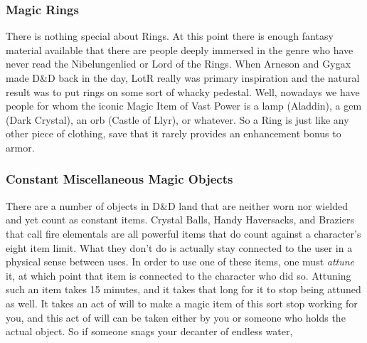 \subsubsection{Magic Rings}
\vspace*{-8pt}

There is nothing special about Rings. At this point there is enough fantasy material available that there are people deeply immersed in the genre who have never read the Nibelungenlied or Lord of the Rings. When Arneson and Gygax made D\&D back in the day, LotR really was primary inspiration and the natural result was to put rings on some sort of whacky pedestal. Well, nowadays we have people for whom the iconic Magic Item of Vast Power is a lamp (Aladdin), a gem (Dark Crystal), an orb (Castle of Llyr), or whatever. So a Ring is just like any other piece of clothing, save that it rarely provides an enhancement bonus to armor.

\subsubsection{Constant Miscellaneous Magic Objects}

There are a number of objects in D\&D land that are neither worn nor wielded and yet count as constant items. Crystal Balls, Handy Haversacks, and Braziers that call fire elementals are all powerful items that do count against a character's eight item limit. What they don't do is actually stay connected to the user in a physical sense between uses. In order to use one of these items, one must \emph{attune} it, at which point that item is connected to the character who did so. Attuning such an item takes 15 minutes, and it takes that long for it to stop being attuned as well. It takes an act of will to make a magic item of this sort stop working for you, and this act of will can be taken either by you or someone who holds the actual object. So if someone snags your decanter of endless water,


